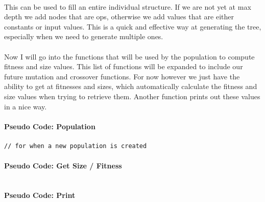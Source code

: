 \documentclass[paper=a4, fontsize=11pt]{scrartcl} %
\numberwithin{equation}{section} %
\numberwithin{figure}{section} %
\numberwithin{table}{section} %
\begin{document}
\paragraph{} This can be used to fill an entire individual structure. If we are not yet at max depth we add nodes that are ops, otherwise we add values that are either constants or input values. This is a quick and effective way at generating the tree, especially when we need to generate multiple ones.

\paragraph{} Now I will go into the functions that will be used by the population to compute fitness and size values. This list of functions will be expanded to include our future mutation and crossover functions. For now however we just have the ability to get at fitnesses and sizes, which automatically calculate the fitness and size values when trying to retrieve them. Another function prints out these values in a nice way.

\paragraph{Pseudo Code: Population}
\begin{verbatim}
// for when a new population is created

\end{verbatim}

\paragraph{} 

\paragraph{Pseudo Code: Get Size / Fitness}
\begin{verbatim}

\end{verbatim}

\paragraph{} 

\paragraph{Pseudo Code: Print}
\begin{verbatim}

\end{verbatim}
\end{document}
